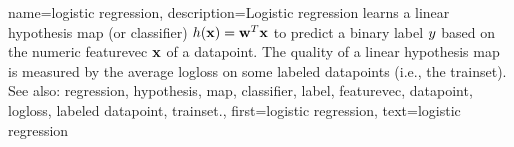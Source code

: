 {name={logistic regression}, 
	description={Logistic \gls{regression} learns a 
		linear \gls{hypothesis} \gls{map} (or \gls{classifier}) $h({\bf x}) = {\bf w}^{T} {\bf x}$ 
		to predict a binary \gls{label} $y$ based on the numeric \gls{featurevec} ${\bf x}$ of 
		a \gls{datapoint}. The quality of a linear \gls{hypothesis} \gls{map} is measured by the average \gls{logloss} 
		on some \glspl{labeled datapoint} (i.e., the \gls{trainset}).
				\\
		See also: \gls{regression}, \gls{hypothesis}, \gls{map}, \gls{classifier}, \gls{label}, \gls{featurevec}, \gls{datapoint}, \gls{logloss}, \gls{labeled datapoint}, \gls{trainset}.},
	first={logistic regression},
	text={logistic regression}
}
	

